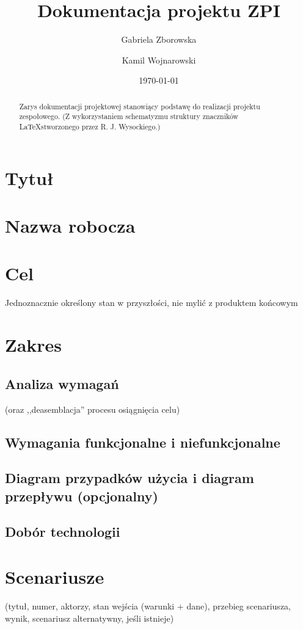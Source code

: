 \documentclass[12pt,a4paper]{article}
\begin{document}
\title{Dokumentacja projektu ZPI}
\author{Gabriela Zborowska}
\author{Kamil Wojnarowski}
\date{\today}

\maketitle

\begin{abstract}
Zarys dokumentacji projektowej stanowiący podstawę do realizacji projektu zespołowego. (Z wykorzystaniem schematyzmu struktury znaczników \LaTeX  stworzonego przez R. J. Wysockiego.)
\end{abstract}

\newpage

\tableofcontents
\listoftables
\listoffigures

\newpage

\section{Tytuł}
\section{Nazwa robocza}
\section{Cel}
Jednoznacznie określony stan w przyszłości, nie mylić z produktem końcowym
\section{Zakres}
\subsection{Analiza wymagań}
 (oraz ,,deasemblacja'' procesu osiągnięcia celu)
\subsection{Wymagania funkcjonalne i niefunkcjonalne}
\subsection{Diagram przypadków użycia i diagram przepływu (opcjonalny)}
\subsection{Dobór technologii}
\section{Scenariusze}
(tytuł, numer, aktorzy, stan wejścia (warunki + dane), przebieg scenariusza, wynik, scenariusz alternatywny, jeśli istnieje)
\end{document}
